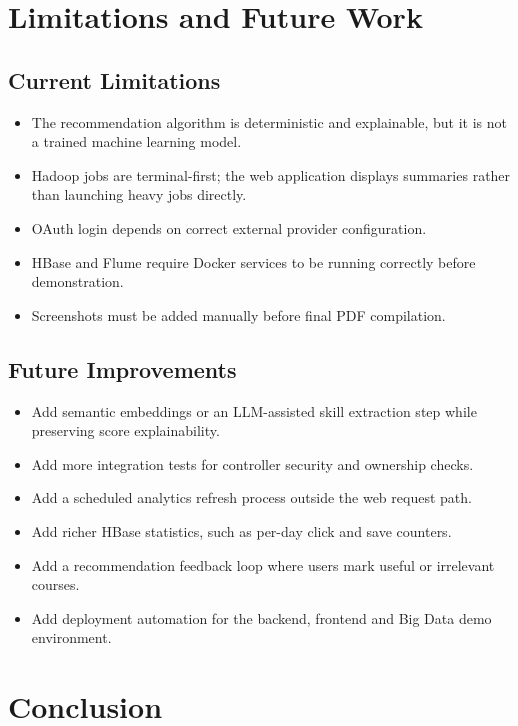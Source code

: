 \documentclass[12pt,a4paper]{report}
\begin{document}
\chapter{Limitations and Future Work}

\section{Current Limitations}
\begin{itemize}[leftmargin=*]
    \item The recommendation algorithm is deterministic and explainable, but it is not a trained machine learning model.
    \item Hadoop jobs are terminal-first; the web application displays summaries rather than launching heavy jobs directly.
    \item OAuth login depends on correct external provider configuration.
    \item HBase and Flume require Docker services to be running correctly before demonstration.
    \item Screenshots must be added manually before final PDF compilation.
\end{itemize}

\section{Future Improvements}
\begin{itemize}[leftmargin=*]
    \item Add semantic embeddings or an LLM-assisted skill extraction step while preserving score explainability.
    \item Add more integration tests for controller security and ownership checks.
    \item Add a scheduled analytics refresh process outside the web request path.
    \item Add richer HBase statistics, such as per-day click and save counters.
    \item Add a recommendation feedback loop where users mark useful or irrelevant courses.
    \item Add deployment automation for the backend, frontend and Big Data demo environment.
\end{itemize}

\chapter{Conclusion}
\end{document}

